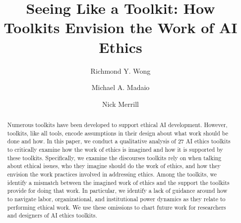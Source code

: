 \documentclass[acmsmall]{acmart}
\begin{document}
\title{Seeing Like a Toolkit: How Toolkits Envision the Work of AI Ethics}



\author{Richmond Y. Wong}

\author{Michael A. Madaio}

\author{Nick Merrill}



\renewcommand{\shortauthors}{Wong, Madaio \& Merrill}

\begin{abstract}
    Numerous toolkits have been developed to support ethical AI development. However, toolkits, like all tools, encode assumptions in their design about what work should be done and how. In this paper, we conduct a qualitative analysis of 27 AI ethics toolkits to critically examine how the work of ethics is imagined and how it is supported by these toolkits. Specifically, we examine the discourses toolkits rely on when talking about ethical issues, who they imagine should do the work of ethics, and how they envision the work practices involved in addressing ethics. Among the toolkits, we identify a mismatch between the imagined work of ethics and the support the toolkits provide for doing that work. In particular, we identify a lack of guidance around how to navigate labor, organizational, and institutional power dynamics as they relate to performing ethical work. We use these omissions to chart future work for researchers and designers of AI ethics toolkits.
\end{abstract}
\end{document}
